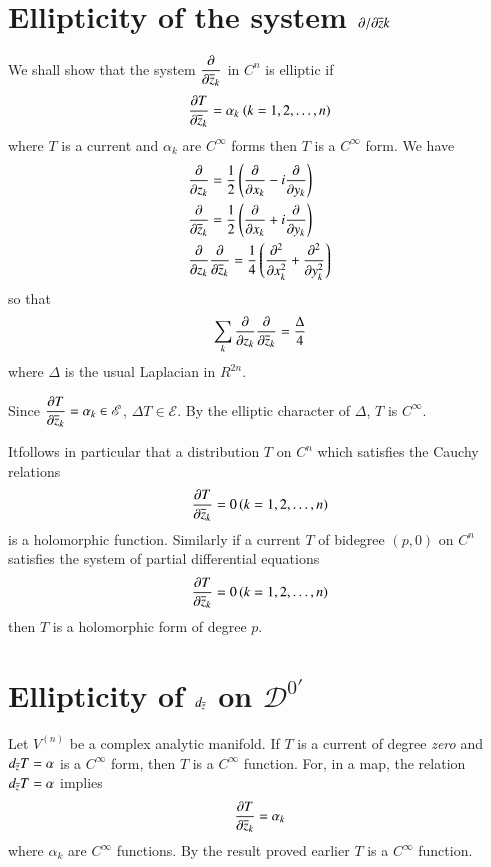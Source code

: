 \section*{Ellipticity of the system $\partial/\partial \overline{z}k$}

We shall show that the system $\dfrac{\partial}{\partial \overline{z}_{k}}$
in $C^{n}$ is elliptic \iec if
$$
\frac{\partial T}{\partial \overline{z}_{k}}=\alpha_{k}~(k=1,2,\ldots,n)
$$
where $T$ is a current and $\alpha_{k}$ are $C^{\infty}$ forms then
$T$ is a $C^{\infty}$ form. We have
\begin{align*}
& \frac{\partial}{\partial
  z_{k}}=\frac{1}{2}\left(\frac{\partial}{\partial
  x_{k}}-i\frac{\partial}{\partial y_{k}}\right)\\
& \frac{\partial}{\partial
    \overline{z}_{k}}=\frac{1}{2}\left(\frac{\partial}{\partial
    x_{k}}+i\frac{\partial}{\partial y_{k}}\right)\\
& \frac{\partial}{\partial z_{k}}\frac{\partial}{\partial
    \overline{z}_{k}}=\frac{1}{4}\left(\frac{\partial^{2}}{\partial
    x^{2}_{k}}+\frac{\partial^{2}}{\partial y^{2}_{k}}\right) 
\end{align*}
so that
$$
\sum_{k}\frac{\partial}{\partial z_{k}}\frac{\partial}{\partial
  \overline{z}_{k}}=\frac{\Delta}{4} 
$$
where $\Delta$ is the usual Laplacian in $R^{2n}$.

Since $\dfrac{\partial T}{\partial
  \overline{z}_{k}}=\alpha_{k}\in\mathscr{E}$, $\Delta T\in\mathscr{E}$. By
the elliptic character of $\Delta$, $T$ is $C^{\infty}$.

It\pageoriginale follows in particular that a distribution $T$ on
$C^{n}$ which satisfies the Cauchy relations
$$
\frac{\partial T}{\partial \overline{z}_{k}}=0\,(k=1,2,\ldots,n)
$$
is a holomorphic function. Similarly if a current $T$ of bidegree
$(p,0)$ on $C^{n}$ satisfies the system of partial differential
equations
$$
\frac{\partial T}{\partial \overline{z}_{k}}=0\, (k=1,2,\ldots,n)
$$
then $T$ is a holomorphic form of degree $p$.

\section*{Ellipticity of $d_{\overline{z}}$ on $\mathscr{D}^{0'}$}

Let $V^{(n)}$ be a complex analytic manifold. If $T$ is a current of
degree {\em zero} and $d_{\overline{z}}T=\alpha$ is a $C^{\infty}$ form,
then $T$ is a $C^{\infty}$ function. For, in a map, the relation
$d_{\overline{z}}T=\alpha$ implies
$$
\frac{\partial T}{\partial \overline{z}_{k}}=\alpha_{k}
$$
where $\alpha_{k}$ are $C^{\infty}$ functions. By the result proved
earlier $T$ is a $C^{\infty}$ function.

